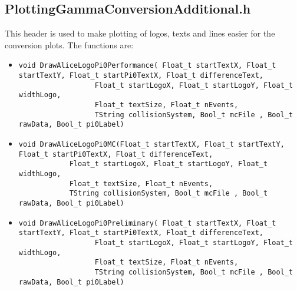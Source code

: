 	\subsection{PlottingGammaConversionAdditional.h}
	This header is used to make plotting of logos, texts and lines easier for the conversion plots. The functions are:
	\begin{itemize}
	 \item 	\begin{lstlisting}
void DrawAliceLogoPi0Performance( Float_t startTextX, Float_t startTextY, Float_t startPi0TextX, Float_t differenceText,
				  Float_t startLogoX, Float_t startLogoY, Float_t widthLogo, 
				  Float_t textSize, Float_t nEvents,
				  TString collisionSystem, Bool_t mcFile , Bool_t rawData, Bool_t pi0Label)
	       	\end{lstlisting}
\item 	\begin{lstlisting}
void DrawAliceLogoPi0MC(Float_t startTextX, Float_t startTextY, Float_t startPi0TextX, Float_t differenceText,
			Float_t startLogoX, Float_t startLogoY, Float_t widthLogo, 
			Float_t textSize, Float_t nEvents,
			TString collisionSystem, Bool_t mcFile , Bool_t rawData, Bool_t pi0Label)
	       	\end{lstlisting}
\item 	\begin{lstlisting}
void DrawAliceLogoPi0Preliminary( Float_t startTextX, Float_t startTextY, Float_t startPi0TextX, Float_t differenceText,
				  Float_t startLogoX, Float_t startLogoY, Float_t widthLogo, 
				  Float_t textSize, Float_t nEvents,
				  TString collisionSystem, Bool_t mcFile , Bool_t rawData, Bool_t pi0Label)
	       	\end{lstlisting}


\end{itemize}

